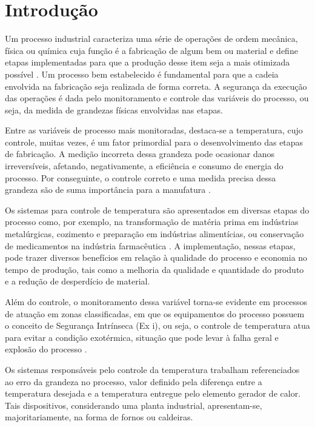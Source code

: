 \section{Introdução}
    Um processo industrial caracteriza uma série de operações de ordem mecânica, física ou química cuja função é a fabricação de algum bem ou material e define etapas implementadas para que a produção desse item seja a mais otimizada possível \cite{Definicao_Processo}. Um processo bem estabelecido é fundamental para que a cadeia envolvida na fabricação seja realizada de forma correta. A segurança da execução das operações é dada pelo monitoramento e controle das variáveis do processo, ou seja, da medida de grandezas físicas envolvidas nas etapas.
    
    Entre as variáveis de processo mais monitoradas, destaca-se a temperatura, cujo controle, muitas vezes, é um fator primordial para o desenvolvimento das etapas de fabricação. A medição incorreta dessa grandeza pode ocasionar danos irreversíveis, afetando, negativamente, a eficiência e consumo de energia do processo. Por conseguinte, o controle correto e uma medida precisa dessa grandeza são de suma importância para a manufatura \cite{Apostila_Sense}.
    
    Os sistemas para controle de temperatura são apresentados em diversas etapas do processo como, por exemplo, na transformação de matéria prima em indústrias metalúrgicas, cozimento e preparação em indústrias alimentícias, ou conservação de medicamentos na indústria farmacêutica \cite{Apostila_Sense}. A implementação, nessas etapas, pode trazer diversos benefícios em relação à qualidade do processo e economia no tempo de produção, tais como a melhoria da qualidade e quantidade do produto e a redução de desperdício de material.
    
    Além do controle, o monitoramento dessa variável torna-se evidente em processos de atuação em zonas classificadas, em que os equipamentos do processo possuem o conceito de Segurança Intrínseca (Ex i), ou seja, o controle de temperatura atua para evitar a condição exotérmica, situação que pode levar à falha geral e explosão do processo \cite{Seguranca_Intrinseca}.
    
    Os sistemas responsáveis pelo controle da temperatura trabalham referenciados ao erro da grandeza no processo, valor definido pela diferença entre a temperatura desejada e a temperatura entregue pelo elemento gerador de calor. Tais dispositivos, considerando uma planta industrial, apresentam-se, majoritariamente, na forma de fornos ou caldeiras.
    
